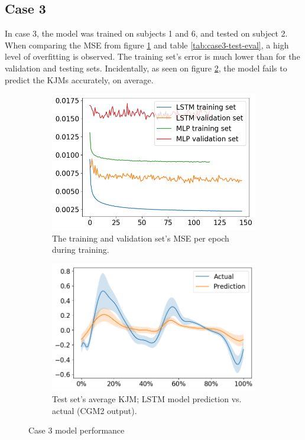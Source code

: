 \documentclass[../main.tex]{subfiles}
\begin{document}
\subsection{Case 3}
\label{sec:results-case3}
In case 3, the model was trained on subjects 1 and 6, and tested on subject 2.
When comparing the \ac{MSE} from figure \ref{fig:case3-training-performance} and table \ref{tab:case3-test-eval}, a high level of overfitting is observed.
The training set's error is much lower than for the validation and testing sets.
Incidentally, as seen on figure \ref{fig:case3-prediction-performance}, the model fails to predict the \acp{KJM} accurately, on average.
\begin{figure}[!htb]
     \centering
     \begin{subfigure}[b]{0.475\textwidth}
         \centering
         \includegraphics[width=\textwidth]{img/results/training_history/Case3_LSTMvsMLP_training.png}
         \caption{The training and validation set's \ac{MSE} per epoch during training.}
         \label{fig:case3-training-performance}
     \end{subfigure}
     \hfill
     \begin{subfigure}[b]{0.515\textwidth}
         \centering
         \includegraphics[width=\textwidth]{img/results/test_prediction_evaluation/Case3_LSTM_test_prediction.png}
         \caption{Test set's average \ac{KJM}; LSTM model prediction vs. actual (CGM2 output).}
         \label{fig:case3-prediction-performance}
     \end{subfigure}
    \caption{Case 3 model performance}
    \label{fig:case3-performance-plots}
\end{figure}
\end{document}
